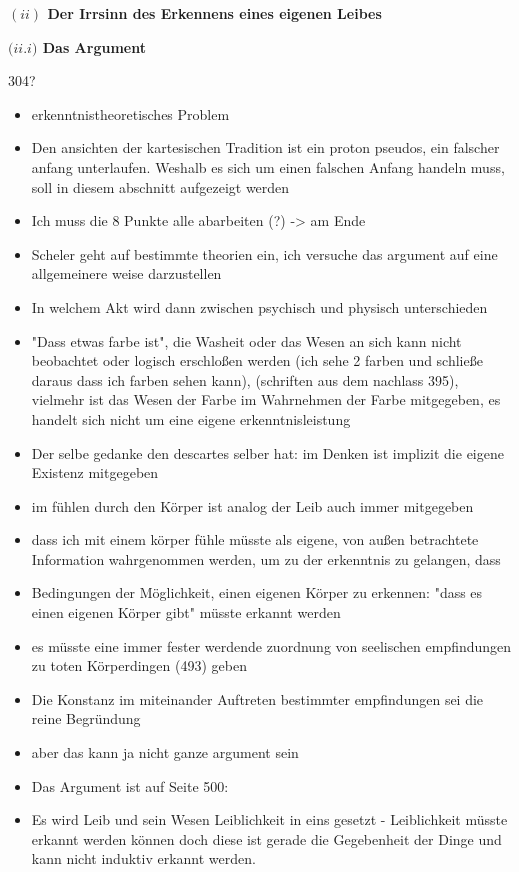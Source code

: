 \documentclass[a4paper, 12pt]{article}
\begin{document}
\begin{onehalfspace}
\vspace{5mm}
\noindent\textbf{$(ii)$ Der Irrsinn des Erkennens eines eigenen Leibes}

\vspace{3mm}
\noindent\textbf{$(ii.$\footnotesize$i$\normalsize$)$ Das Argument}

304? 

\begin{itemize}
  \item erkenntnistheoretisches Problem
  \item Den ansichten der kartesischen Tradition ist ein proton pseudos, ein falscher anfang unterlaufen. Weshalb es sich um einen falschen Anfang handeln muss, soll in diesem abschnitt aufgezeigt werden
  \item Ich muss die 8 Punkte alle abarbeiten (?) -> am Ende
  \item Scheler geht auf bestimmte theorien ein, ich versuche das argument auf eine allgemeinere weise darzustellen
  \item In welchem Akt wird dann zwischen psychisch und physisch unterschieden
  \item "Dass etwas farbe ist", die Washeit oder das Wesen an sich kann nicht beobachtet oder logisch erschloßen werden (ich sehe 2 farben und schließe daraus dass ich farben sehen kann), (schriften aus dem nachlass 395), vielmehr ist das Wesen der Farbe im Wahrnehmen der Farbe mitgegeben, es handelt sich nicht um eine eigene erkenntnisleistung
  \item Der selbe gedanke den descartes selber hat: im Denken ist implizit die eigene Existenz mitgegeben
  \item im fühlen durch den Körper ist analog der Leib auch immer mitgegeben
  \item dass ich mit einem körper fühle müsste als eigene, von außen betrachtete Information wahrgenommen werden, um zu der erkenntnis zu gelangen, dass 
  \item Bedingungen der Möglichkeit, einen eigenen Körper zu erkennen: "dass es einen eigenen Körper gibt" müsste erkannt werden
  \item es müsste eine immer fester werdende zuordnung von seelischen empfindungen zu toten Körperdingen (493) geben
  \item Die Konstanz im miteinander Auftreten bestimmter empfindungen sei die reine Begründung
  \item aber das kann ja nicht ganze argument sein
  \item Das Argument ist auf Seite 500:
  \item Es wird Leib und sein Wesen Leiblichkeit in eins gesetzt - Leiblichkeit müsste erkannt werden können doch diese ist gerade die Gegebenheit der Dinge und kann nicht induktiv erkannt werden.
\end{itemize}


\end{onehalfspace}
\end{document}
